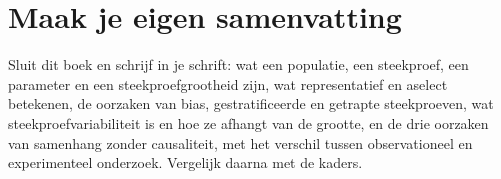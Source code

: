 \begin{oefeningen}

\end{oefeningen}


\begin{oefeningen}






\end{oefeningen}


\ifzelfstudie
\section*{Maak je eigen samenvatting}
Sluit dit boek en schrijf in je schrift: wat een populatie, een steekproef, een parameter en een steekproefgrootheid zijn, wat representatief en aselect betekenen, de oorzaken van bias, gestratificeerde en getrapte steekproeven, wat steekproefvariabiliteit is en hoe ze afhangt van de grootte, en de drie oorzaken van samenhang zonder causaliteit, met het verschil tussen observationeel en experimenteel onderzoek. Vergelijk daarna met de kaders.
\fi
